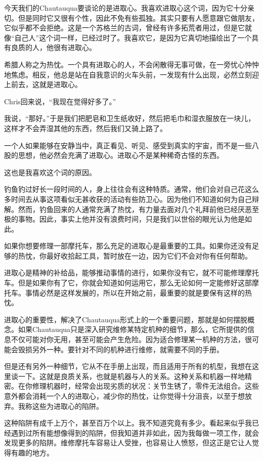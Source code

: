 \documentclass[UTF8]{article}
\begin{document}
\par 今天我们的Chautauqua要谈论的是进取心。我喜欢进取心这个词，因为它十分亲切。但是同时它又很有个性，因此不免有些孤独。其实只要有人愿意跟它做朋友，它似乎都不会拒绝。这是一个苏格兰的古词，曾经有许多拓荒者用过，但是它就像“自己人”这个词一样，已经过时了。我喜欢它，是因为它真切地描绘出了一个具有良质的人，他很有进取心。
\par 希腊人称之为热忱。一个具有进取心的人，不会闲散得无事可做，在一旁忧心忡忡地焦虑。相反，他总是站在自我意识的火车头前，一发现有什么出现，必然立刻迎上前去，这就是进取心。
\par Chris回来说，“我现在觉得好多了。”
\par 我说，“那好。”于是我们把肥皂和卫生纸收好，然后把毛巾和湿衣服放在一块儿，这样才不会弄湿其他的东西，然后我们又骑上路了。
\par 一个人如果能够在安静当中，真正看见、听见、感受到真实的宇宙，而不是一些八股的思想，他必然会充满了进取心。进取心不是某种稀奇古怪的东西。
\par 这也是我喜欢这个词的原因。
\par 钓鱼钓过好长一段时间的人，身上往往会有这种特质。通常，他们会对自己花这么多时间去从事这项看似无甚收获的活动有些防卫心。因为他们不知道如何为自己辩解。然而，钓鱼回来的人通常充满了热忱，有力量去面对几个礼拜前他已经厌恶至极的事物。因此，事实上他并没有浪费时间，只是我们以世俗的眼光认为他是如此。
\par 如果你想要修理一部摩托车，那么充足的进取心是最重要的工具。如果你还没有足够的热忱，你最好收拾起工具，暂时放在一边，因为它们不会对你有任何帮助。
\par 进取心是精神的补给品，能够推动事情的进行，如果你没有它，就不可能修理摩托车。但是如果你有了它，你就会知道如何运用它，那么无论如何一定能修好这部摩托车。事情必然是这样发展的，所以在开始之前，最重要的就是要保有这样的热忱。
\par 进取心的重要性，解决了Chautauqua形式上的一个重要问题，那就是如何摆脱概念。如果Chautauqua只是深入研究维修某特定机种的细节，那么，它所提供的信息不仅可能对你无用，甚至可能会产生危险。因为适合修理某一机种的方法，很可能会毁损另外一种。要针对不同的机种进行维修，就需要不同的手册。
\par 但是还有另外一种细节，它从不在手册上出现，而且适用于所有的机型，我想在这里谈一下。这就是良质关系，也就是机器与人的关系。这种关系和机器一样地精密。在你修理机器时，经常会出现劣质的状况：关节生锈了，零件无法组合。这些意外都会消耗一个人的进取心，减少你的热忱，让你觉得十分沮丧，以至于想放弃。我称这些为进取心的陷阱。
\par 这种陷阱有成千上万个，甚至百万个以上。我不知道究竟有多少。看起来似乎我已经遇到过所有能想像得到的陷阱，但我知道并非如此，因为我每做一项工作，就会发现更多的陷阱。维修摩托车容易让人受挫，也容易让人愤怒，但这正是它让人觉得有趣的地方。
\end{document}
